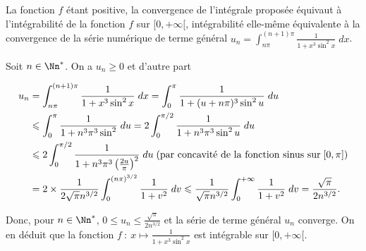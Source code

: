 {\begin{enumerate}
{La fonction $f$ étant positive, la convergence de l'intégrale proposée équivaut à l'intégrabilité de la fonction $f$ sur $[0,+\infty[$, intégrabilité elle-même équivalente à la convergence de la série numérique de terme général $u_n =\int_{n\pi}^{(n+1)\pi}\frac{1}{1+x^3\sin^2x}\;dx$.



Soit $n\in\Nn^*$. On a $u_n\geqslant0$ et d'autre part



\begin{align*}\ensuremath
u_n&=\int_{n\pi}^{(n+1)\pi}\frac{1}{1+x^3\sin^2x}\;dx=\int_{0}^{\pi}\frac{1}{1+(u+n\pi)^3\sin^2u}\;du\\
 &\leqslant\int_{0}^{\pi}\frac{1}{1+n^3\pi^3\sin^2}\;du = 2\int_{0}^{\pi/2}\frac{1}{1+n^3\pi^3\sin^2u}\;du\\
 &\leqslant2\int_{0}^{\pi/2}\frac{1}{1+n^3\pi^3\left(\frac{2u}{\pi}\right)^2}\;du\;(\text{par concavité de la fonction sinus sur}\;[0,\pi])\\
 &= 2\times\frac{1}{2\sqrt{\pi}n^{3/2}}\int_{0}^{(n\pi)^{3/2}}\frac{1}{1+v^2}\;dv\leqslant\frac{1}{\sqrt{\pi}n^{3/2}}\int_{0}^{+\infty}\frac{1}{1+v^2}\;dv =\frac{\sqrt{\pi}}{2n^{3/2}}.
\end{align*}



	

Donc, pour $n\in\Nn^*$, $0\leqslant u_n\leqslant\frac{\sqrt{\pi}}{2n^{3/2}}$ et la série de terme général $u_n$ converge. On en déduit que la fonction $f~:~x\mapsto\frac{1}{1+x^3\sin^2x}$ est intégrable sur $[0,+\infty[$.}
\end{enumerate}
}
